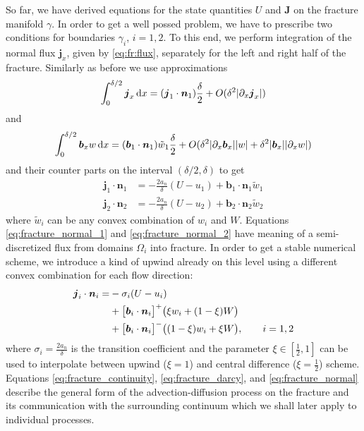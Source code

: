 \documentclass[12pt,a4paper]{report}
\def\prtl{\partial}
\def\vc#1{\mathbf{\boldsymbol{#1}}}     %
\def\abs#1{\lvert#1\rvert}
\def\d {\,{\rm d}}
\begin{document}
So far, we have derived equations for the state quantities $U$ and $\vc J$ on the fracture manifold $\gamma$. In order to
get a well possed problem, we have to prescribe two conditions for boundaries $\gamma_i$, $i=1,2$. To this end, we
perform integration of the normal flux $\vc j_x$, given by \eqref{eq:fr:flux}, separately for the left and right half of the fracture.
Similarly as before we use approximations
\[
 \int_0^{\delta/2} \vc j_x \d x = (\vc j_1 \cdot \vc n_1)\frac{\delta}{2} + O(\delta^2 \abs{\prtl_x \vc j_x})
\]
and 
\[
 \int_0^{\delta/2} \vc b_x w \d x = (\vc b_1 \cdot \vc n_1)\tilde{w}_1\frac{\delta}{2} + O(\delta^2 \abs{\prtl_x \vc b_x}\abs{w} + \delta^2\abs{\vc b_x}\abs{\prtl_x w})
\]
and their counter parts on the interval $(\delta/2, \delta)$ to get
\begin{align}
    \label{eq:fracture_normal_1}
     \vc j_1 \cdot \vc n_1 &= -\frac{2a_n}{\delta} (U - u_1) + \vc b_1\cdot \vc n_1 \tilde{w}_1\\
    \label{eq:fracture_normal_2}
    \vc j_2 \cdot \vc n_2 &= -\frac{2a_n}{\delta} (U - u_2) + \vc b_2\cdot \vc n_2 \tilde{w}_2
\end{align}
where $\tilde w_i$ can be any convex combination of $w_i$ and $W$. Equations \eqref{eq:fracture_normal_1}  
and \eqref{eq:fracture_normal_2} have meaning of a semi-discretized flux from domains $\Omega_i$ into fracture.
In order to get a stable numerical scheme, we introduce a kind of upwind already on this level using a different convex 
combination for each flow direction:
\begin{align}
   \notag 
   \vc j_i \cdot \vc n_i
       = &-\sigma_i (U - u_i)      \\ 
   \notag
      &+ \big[\vc b_i\cdot \vc n_i\big]^{+} \big(\xi w_i + (1-\xi) W\big)       \\
      \label{eq:fracture_normal}
      &+ \big[\vc b_i\cdot \vc n_i\big]^{-} \big((1-\xi) w_i + \xi W\big), \qquad i=1,2
\end{align}
where $\sigma_i = \frac{2a_n}{\delta}$ is the transition coefficient and the parameter $\xi\in [\frac12, 1]$ can be used to interpolate
between upwind ($\xi = 1$) and central difference ($\xi=\frac12$) scheme. Equations \eqref{eq:fracture_continuity}, \eqref{eq:fracture_darcy}, and
\eqref{eq:fracture_normal} describe the general form of the advection-diffusion process on the fracture and its communication with 
the surrounding continuum which we shall later apply to individual processes.



\end{document}

